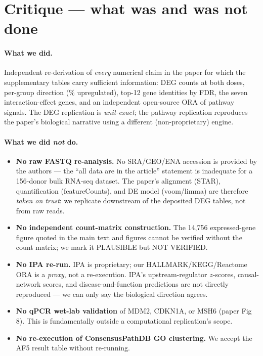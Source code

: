 \documentclass[11pt]{article}
\begin{document}
\section{Critique --- what was and was not done}

\paragraph{What we did.}
Independent re-derivation of \emph{every} numerical claim in the paper for which the supplementary tables carry sufficient information: DEG counts at both doses, per-group direction (\% upregulated), top-12 gene identities by FDR, the seven interaction-effect genes, and an independent open-source ORA of pathway signals. The DEG replication is \emph{unit-exact}; the pathway replication reproduces the paper's biological narrative using a different (non-proprietary) engine.

\paragraph{What we did \emph{not} do.}
\begin{itemize}
    \item \textbf{No raw FASTQ re-analysis.} No SRA/GEO/ENA accession is provided by the authors --- the ``all data are in the article'' statement is inadequate for a 156-donor bulk RNA-seq dataset. The paper's alignment (STAR), quantification (featureCounts), and DE model (voom/limma) are therefore \emph{taken on trust}: we replicate downstream of the deposited DEG tables, not from raw reads.
    \item \textbf{No independent count-matrix construction.} The 14{,}756 expressed-gene figure quoted in the main text and figures cannot be verified without the count matrix; we mark it PLAUSIBLE but NOT VERIFIED.
    \item \textbf{No IPA re-run.} IPA is proprietary; our HALLMARK/KEGG/Reactome ORA is a \emph{proxy}, not a re-execution. IPA's upstream-regulator $z$-scores, causal-network scores, and disease-and-function predictions are not directly reproduced --- we can only say the biological direction agrees.
    \item \textbf{No qPCR wet-lab validation} of MDM2, CDKN1A, or MSH6 (paper Fig 8). This is fundamentally outside a computational replication's scope.
    \item \textbf{No re-execution of ConsensusPathDB GO clustering.} We accept the AF5 result table without re-running.
\end{itemize}
\end{document}

